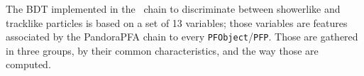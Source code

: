 The BDT implemented in the \pandosmic\ chain to discriminate between showerlike and tracklike particles is based on a set of 13 variables; those variables are features associated by the PandoraPFA chain to every \texttt{PFObject}/\texttt{PFP}. Those are gathered in three groups, by their common characteristics, and the way those are computed. 


